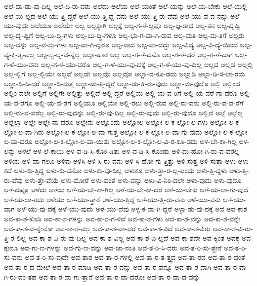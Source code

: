 {ಅಲೆ-ದಾ-ಡು-ವು-ದಿಲ್ಲ
ಅಲೆ-ದಿ-ರು-ವರು
ಅಲೆದು
ಅಲೆಯ
ಅಲೆ-ಯಂತೆ
ಅಲೆ-ಯನ್ನು
ಅಲೆ-ಯ-ಬೇಕು
ಅಲೆ-ಯಲ್ಲಿ
ಅಲೆ-ಯಿ-ಲ್ಲದ
ಅಲೆ-ಯು-ತ್ತಿ-ದ್ದರೆ
ಅಲೆ-ಯು-ತ್ತಿ-ದ್ದ-ವನು
ಅಲೆ-ಯು-ತ್ತಿ-ರು-ವೆವು
ಅಲೆ-ಯು-ವ-ವ-ನನ್ನು
ಅಲೆ-ಯು-ವುದು
ಅಲೆಯೂ
ಅಲೆಯೇ
ಅಲ್ಪ
ಅಲ್ಪಕ್ಕಾಗಿ
ಅಲ್ಪಕ್ಕೆ
ಅಲ್ಪ-ಗ-ಳೆ-ಲ್ಲವೂ
ಅಲ್ಪ-ಜ್ಞ-ರಾದ
ಅಲ್ಪ-ತನ
ಅಲ್ಪ-ದೃಷ್ಟಿ
ಅಲ್ಪ-ದೃ-ಷ್ಟಿಗೆ
ಅಲ್ಪ-ಬು-ದ್ಧಿ-ಗಳು
ಅಲ್ಪ-ಬು-ದ್ಧಿ-ಗಳೂ
ಅಲ್ಪ-ಭಾ-ಗ-ವಾ-ಗಿ-ರುವ
ಅಲ್ಪ-ಮತಿ
ಅಲ್ಪ-ಮ-ತಿಗೆ
ಅಲ್ಪರು
ಅಲ್ಪ-ವನ್ನು
ಅಲ್ಪ-ವ-ಸ್ತು-ಗಳು
ಅಲ್ಪ-ವಾ-ಗಿ-ದ್ದರೂ
ಅಲ್ಪ-ವಾದ
ಅಲ್ಪ-ವಾ-ದದ್ದು
ಅಲ್ಪ-ವಿದ್ಯ
ಅಲ್ಪ-ವಿ-ದ್ಯೆ-ಯಿಂದ
ಅಲ್ಪ-ವ್ಯ-ಕ್ತಿ-ತ್ವ-ವಲ್ಲ
ಅಲ್ಪ-ಸ್ವ-ಲ್ಪ-ವ-ನ್ನೆಲ್ಲ
ಅಲ್ಪಾ-ಹಾರ
ಅಲ್ಲ
ಅಲ್ಲ-ಗ-ಳೆ-ದನೊ
ಅಲ್ಲ-ಗ-ಳೆ-ದರೆ
ಅಲ್ಲ-ಗ-ಳೆ-ದಾಗ
ಅಲ್ಲ-ಗ-ಳೆ-ಯು-ವನು
ಅಲ್ಲ-ಗ-ಳೆ-ಯು-ವರೊ
ಅಲ್ಲ-ಗ-ಳೆ-ಯು-ವು-ದಕ್ಕೆ
ಅಲ್ಲ-ಗ-ಳೆ-ಯು-ವು-ದಿಲ್ಲ
ಅಲ್ಲದ
ಅಲ್ಲದೆ
ಅಲ್ಲಲ್ಲಿ
ಅಲ್ಲ-ಲ್ಲಿಗೆ
ಅಲ್ಲ-ಲ್ಲಿಯೇ
ಅಲ್ಲವೆ
ಅಲ್ಲವೇ
ಅಲ್ಲವೊ
ಅಲ್ಲವೋ
ಅಲ್ಲಾ-ಡ-ಕೂ-ಡದು
ಅಲ್ಲಾಡಿ
ಅಲ್ಲಾ-ಡಿ-ಸ-ಲಾ-ರದು
ಅಲ್ಲಾ-ಡಿ-ಸಿ-ದರೆ
ಅಲ್ಲಾ-ಡಿ-ಸುತ್ತ
ಅಲ್ಲಾ-ಡು-ತ್ತಿ-ದ್ದರೆ
ಅಲ್ಲಾ-ಡು-ತ್ತಿ-ರು-ವುದು
ಅಲ್ಲಾ-ಡು-ವುದೊ
ಅಲ್ಲಿ
ಅಲ್ಲಿಂದ
ಅಲ್ಲಿಂ-ದಲೇ
ಅಲ್ಲಿಗೆ
ಅಲ್ಲಿಗೇ
ಅಲ್ಲಿತ್ತು
ಅಲ್ಲಿದೆ
ಅಲ್ಲಿ-ದ್ದರೆ
ಅಲ್ಲಿಯ
ಅಲ್ಲಿ-ಯ-ವ-ರಿಗೆ
ಅಲ್ಲಿ-ಯ-ವರೆ-ಗಾ-ದರೂ
ಅಲ್ಲಿ-ಯ-ವ-ರೆಗೂ
ಅಲ್ಲಿ-ಯ-ವ-ರೆಗೆ
ಅಲ್ಲಿಯೂ
ಅಲ್ಲಿಯೇ
ಅಲ್ಲಿ-ರಲು
ಅಲ್ಲಿ-ರುವ
ಅಲ್ಲಿ-ರು-ವನು
ಅಲ್ಲಿ-ರು-ವ-ವ-ರೆಗೆ
ಅಲ್ಲಿ-ರು-ವ-ವರೆಲ್ಲ
ಅಲ್ಲಿ-ರು-ವುದನ್ನು
ಅಲ್ಲಿ-ರು-ವು-ದಿಲ್ಲ
ಅಲ್ಲಿ-ರು-ವುದು
ಅಲ್ಲಿ-ರು-ವುದೂ
ಅಲ್ಲಿವೆ
ಅಲ್ಲೆ
ಅಲ್ಲೆಲ್ಲ
ಅಲ್ಲೆಲ್ಲಾ
ಅಲ್ಲೇ
ಅಲ್ಲೇ-ನಾ-ದರೂ
ಅಲ್ಲೇನು
ಅಲ್ಲೊಂದು
ಅಲ್ಲೋಲ
ಅಲ್ಲೋ-ಲ-ಕ-ಲ್ಲೋ-ಲ-ಗಳು
ಅಲ್ಲೋ-ಲ-ಕ-ಲ್ಲೋ-ಲ-ವಾ-ಗಿರು
ಅಲ್ಲೋ-ಲ-ಕ-ಲ್ಲೋ-ಲ-ವಾ-ಗುತ್ತ
ಅಲ್ಲೋ-ಲ-ಕ-ಲ್ಲೋ-ಲ-ವಾ-ಗು-ವುದು
ಅಲ್ಲೋ-ಲ-ಕ-ಲ್ಲೋ-ಲ-ವಾ-ದರೂ
ಅಲ್ಲೋ-ಲ-ಕ-ಲ್ಲೋ-ಲ-ವಾ-ಯಿತು
ಅಲ್ಲೋ-ಲ-ಕ-ಲ್ಲೋ-ಲ-ವಿ-ರ-ಕೂ-ಡದು
ಅಳ-ಬೇ-ಕಾ-ಗಿಲ್ಲ
ಅಳ-ಲನ್ನು
ಅಳಲೆ
ಅಳ-ಲೆ-ಕಾಯಿ
ಅಳ-ವ-ಡಿ-ಸಿ-ಕೊಂ-ಡಿತು
ಅಳ-ವ-ಡಿ-ಸಿ-ಕೊಂಡು
ಅಳಿ-ದು-ಹೋ-ಗಿ-ರು-ವ-ವರೆಲ್ಲ
ಅಳಿಯ
ಅಳಿ-ವಾ-ಗಲೂ
ಅಳಿವು
ಅಳಿಸಿ
ಅಳಿ-ಸಿ-ರು-ವನು
ಅಳಿ-ಸಿ-ಹೋ-ಗು-ತ್ತಿತ್ತು
ಅಳಿ-ಸುತ್ತ
ಅಳಿ-ಸುತ್ತಾ
ಅಳು
ಅಳು-ಕದೆ
ಅಳು-ಕು-ತ್ತಿದ್ದ
ಅಳು-ಕು-ವನೋ
ಅಳು-ಕು-ವು-ದಿಲ್ಲ
ಅಳುಕೂ
ಅಳು-ತ್ತಾ-ರ-ಲ್ಲ-ಎಂದು
ಅಳು-ತ್ತಿ-ದ್ದಳು
ಅಳು-ತ್ತಿ-ರು-ವೆವು
ಅಳು-ತ್ತೇ-ವೆಯೆ
ಅಳು-ಮೋರೆ
ಅಳು-ವಂತೆ
ಅಳು-ವನ್ನು
ಅಳು-ವಿ-ನಿಂ-ದಲೇ
ಅಳು-ವುದು
ಅಳು-ವುದೂ
ಅಳೆ-ದಷ್ಟೂ
ಅಳೆದು
ಅಳೆಯ
ಅಳೆ-ಯ-ಬೇ-ಕಾ-ಗಿಲ್ಲ
ಅಳೆ-ಯ-ಬೇ-ಕಾ-ದರೆ
ಅಳೆ-ಯ-ಬೇಕು
ಅಳೆ-ಯ-ಲಾ-ಗು-ವುದೆ
ಅಳೆ-ಯ-ಲಾ-ರದು
ಅಳೆಯು
ಅಳೆ-ಯು-ತ್ತಾರೆ
ಅಳೆ-ಯು-ತ್ತಿದ್ದ
ಅಳೆ-ಯು-ತ್ತಿ-ರು-ವನು
ಅಳೆ-ಯು-ವನು
ಅಳೆ-ಯು-ವಾಗ
ಅಳೆ-ಯು-ವು-ದಕ್ಕೆ
ಅಳೆ-ಯು-ವುದು
ಅಳೆ-ಯು-ವೆವು
ಅಳ್ಳ-ಕ-ವಾ-ಗಿ-ದ್ದರೆ
ಅಳ್ಳಾ-ಡು-ವು-ದಕ್ಕೆ
ಅವ
ಅವ-ಕಾಶ
ಅವ-ಕಾ-ಶ-ಕೊಡಿ
ಅವ-ಕಾ-ಶ-ಗಳನ್ನು
ಅವ-ಕಾ-ಶ-ಗ-ಳಿವೆ
ಅವ-ಕಾ-ಶ-ಗಳು
ಅವ-ಕಾ-ಶ-ವನ್ನು
ಅವ-ಕಾ-ಶ-ವನ್ನೇ
ಅವ-ಕಾ-ಶ-ವ-ನ್ನೇನೋ
ಅವ-ಕಾ-ಶ-ವಲ್ಲ
ಅವ-ಕಾ-ಶ-ವಾ-ದರೆ
ಅವ-ಕಾ-ಶ-ವಿದೆ
ಅವ-ಕಾ-ಶ-ವಿರು
ಅವ-ಕಾ-ಶ-ವಿ-ರು-ತ್ತಿ-ರ-ಲಿಲ್ಲ
ಅವ-ಕಾ-ಶ-ವಿ-ರು-ವು-ದಿಲ್ಲ
ಅವ-ಕಾ-ಶ-ವಿಲ್ಲ
ಅವ-ಕಾ-ಶ-ವಿ-ಲ್ಲದೆ
ಅವ-ಕಾ-ಶವೇ
ಅವ-ಕ್ಕಿಂತ
ಅವಕ್ಕೆ
ಅವ-ಕ್ಕೇನೂ
ಅವ-ಗು-ಣ-ಗಳನ್ನು
ಅವ-ಗು-ಣ-ವನ್ನು
ಅವ-ಜಾ-ನಂತಿ
ಅವ-ತ-ರಿ-ಸಿ-ದರು
ಅವ-ತ-ರಿ-ಸು-ತ್ತೇನೆ
ಅವ-ತ-ರಿ-ಸು-ವನು
ಅವ-ತ-ರಿ-ಸು-ವುದೇ
ಅವ-ತಾರ
ಅವ-ತಾ-ರ-ಗಳಲ್ಲಿ
ಅವ-ತಾ-ರ-ತ-ತ್ತ್ವದ
ಅವ-ತಾ-ರದ
ಅವ-ತಾ-ರ-ದಂತೆ
ಅವ-ತಾ-ರ-ದ-ಮೇಲೆ
ಅವ-ತಾ-ರ-ಮಾಡಿ
ಅವ-ತಾ-ರ-ವನ್ನು
ಅವ-ತಾ-ರ-ವನ್ನೂ
ಅವ-ತಾ-ರ-ವಾಗಿ
ಅವ-ತಾ-ರ-ವಾ-ಗಿ-ರು-ವಂ-ತಹ
ಅವ-ತಾ-ರ-ವಾ-ಗು-ತ್ತಾನೆ
ಅವ-ತಾ-ರ-ವಾ-ದರೋ
ಅವ-ತಾ-ರ-ವಾ-ದ-ವನ್ನು
}
